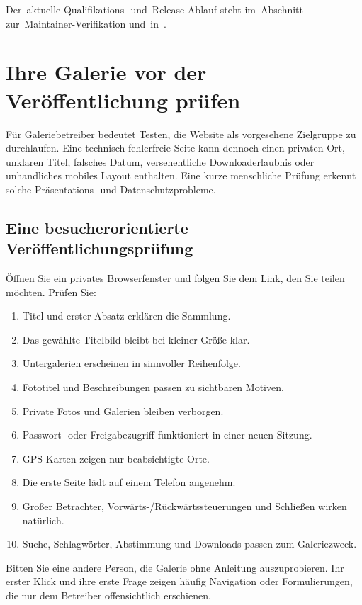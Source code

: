 \documentclass[11pt,a4paper]{article}
\newcommand{\filepath}[1]{\path{#1}}
\begin{document}
Der~aktuelle Qualifikations- und~Release-Ablauf steht im~Abschnitt
zur~Maintainer-Verifikation und~in~\filepath{RELEASE.md}.

\section{Ihre Galerie vor der Veröffentlichung prüfen}
\label{sec:testing}

Für Galeriebetreiber bedeutet Testen, die Website als vorgesehene Zielgruppe zu
durchlaufen. Eine technisch fehlerfreie Seite kann dennoch einen privaten Ort,
unklaren Titel, falsches Datum, versehentliche Downloaderlaubnis oder
unhandliches mobiles Layout enthalten. Eine kurze menschliche Prüfung erkennt
solche Präsentations- und Datenschutzprobleme.

\subsection{Eine besucherorientierte Veröffentlichungsprüfung}

Öffnen Sie ein privates Browserfenster und folgen Sie dem Link, den Sie teilen
möchten. Prüfen Sie:

\begin{enumerate}
  \item Titel und erster Absatz erklären die Sammlung.
  \item Das gewählte Titelbild bleibt bei kleiner Größe klar.
  \item Untergalerien erscheinen in sinnvoller Reihenfolge.
  \item Fototitel und Beschreibungen passen zu sichtbaren Motiven.
  \item Private Fotos und Galerien bleiben verborgen.
  \item Passwort- oder Freigabezugriff funktioniert in einer neuen Sitzung.
  \item GPS-Karten zeigen nur beabsichtigte Orte.
  \item Die erste Seite lädt auf einem Telefon angenehm.
  \item Großer Betrachter, Vorwärts-/Rückwärtssteuerungen und Schließen wirken
  natürlich.
  \item Suche, Schlagwörter, Abstimmung und Downloads passen zum Galeriezweck.
\end{enumerate}

Bitten Sie eine andere Person, die Galerie ohne Anleitung auszuprobieren. Ihr
erster Klick und ihre erste Frage zeigen häufig Navigation oder Formulierungen,
die nur dem Betreiber offensichtlich erschienen.
\end{document}
